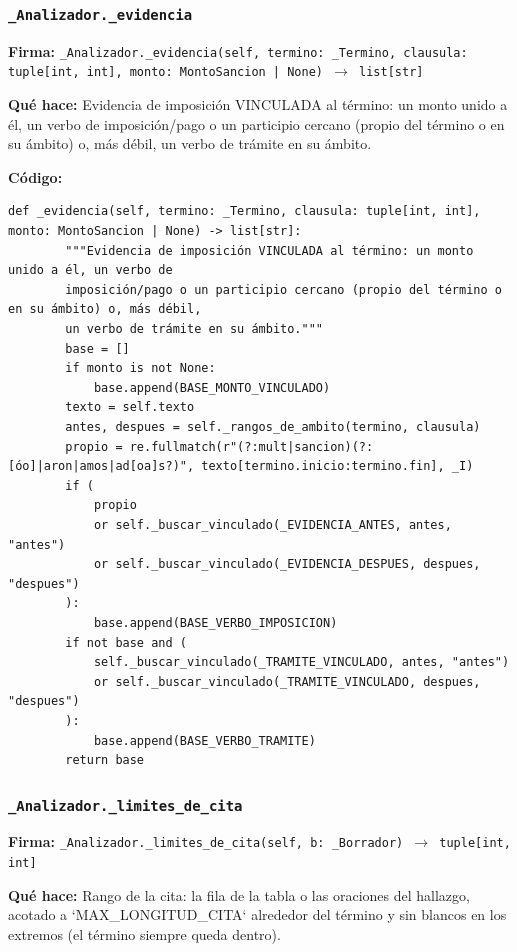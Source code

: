 \documentclass[11pt,a4paper]{article}
\begin{document}
\subsubsection*{\texttt{\_Analizador.\_evidencia}}
\textbf{Firma:} \texttt{\_Analizador.\_evidencia(self, termino: \_Termino, clausula: tuple[int, int], monto: MontoSancion | None) $\rightarrow$ list[str]}

\textbf{Qué hace:} Evidencia de imposición VINCULADA al término: un monto unido a él, un verbo de
imposición/pago o un participio cercano (propio del término o en su ámbito) o, más débil,
un verbo de trámite en su ámbito.

\textbf{Código:}
\begin{lstlisting}
def _evidencia(self, termino: _Termino, clausula: tuple[int, int], monto: MontoSancion | None) -> list[str]:
        """Evidencia de imposición VINCULADA al término: un monto unido a él, un verbo de
        imposición/pago o un participio cercano (propio del término o en su ámbito) o, más débil,
        un verbo de trámite en su ámbito."""
        base = []
        if monto is not None:
            base.append(BASE_MONTO_VINCULADO)
        texto = self.texto
        antes, despues = self._rangos_de_ambito(termino, clausula)
        propio = re.fullmatch(r"(?:mult|sancion)(?:[óo]|aron|amos|ad[oa]s?)", texto[termino.inicio:termino.fin], _I)
        if (
            propio
            or self._buscar_vinculado(_EVIDENCIA_ANTES, antes, "antes")
            or self._buscar_vinculado(_EVIDENCIA_DESPUES, despues, "despues")
        ):
            base.append(BASE_VERBO_IMPOSICION)
        if not base and (
            self._buscar_vinculado(_TRAMITE_VINCULADO, antes, "antes")
            or self._buscar_vinculado(_TRAMITE_VINCULADO, despues, "despues")
        ):
            base.append(BASE_VERBO_TRAMITE)
        return base
\end{lstlisting}

\subsubsection*{\texttt{\_Analizador.\_limites\_de\_cita}}
\textbf{Firma:} \texttt{\_Analizador.\_limites\_de\_cita(self, b: \_Borrador) $\rightarrow$ tuple[int, int]}

\textbf{Qué hace:} Rango de la cita: la fila de la tabla o las oraciones del hallazgo, acotado a `MAX\_LONGITUD\_CITA`
alrededor del término y sin blancos en los extremos (el término siempre queda dentro).
\end{document}
